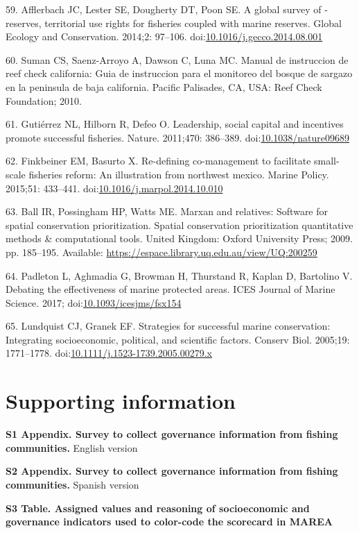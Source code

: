 \documentclass[12pt,]{article}
\begin{document}
\hypertarget{ref-afflerbach_2014-HP}{}
59. Afflerbach JC, Lester SE, Dougherty DT, Poon SE. A global survey of
-reserves, territorial use rights for fisheries coupled with marine
reserves. Global Ecology and Conservation. 2014;2: 97--106.
doi:\href{https://doi.org/10.1016/j.gecco.2014.08.001}{10.1016/j.gecco.2014.08.001}

\hypertarget{ref-suman_2010-ez}{}
60. Suman CS, Saenz-Arroyo A, Dawson C, Luna MC. Manual de instruccion
de reef check california: Guia de instruccion para el monitoreo del
bosque de sargazo en la peninsula de baja california. Pacific Palisades,
CA, USA: Reef Check Foundation; 2010.

\hypertarget{ref-gutirrez_2011-0U}{}
61. Gutiérrez NL, Hilborn R, Defeo O. Leadership, social capital and
incentives promote successful fisheries. Nature. 2011;470: 386--389.
doi:\href{https://doi.org/10.1038/nature09689}{10.1038/nature09689}

\hypertarget{ref-finkbeiner_2015-87}{}
62. Finkbeiner EM, Basurto X. Re-defining co-management to facilitate
small-scale fisheries reform: An illustration from northwest mexico.
Marine Policy. 2015;51: 433--441.
doi:\href{https://doi.org/10.1016/j.marpol.2014.10.010}{10.1016/j.marpol.2014.10.010}

\hypertarget{ref-ball_2009-qi}{}
63. Ball IR, Possingham HP, Watts ME. Marxan and relatives: Software for
spatial conservation prioritization. Spatial conservation prioritization
quantitative methods \& computational tools. United Kingdom: Oxford
University Press; 2009. pp. 185--195. Available:
\url{https://espace.library.uq.edu.au/view/UQ:200259}

\hypertarget{ref-padleton_2017-vn}{}
64. Padleton L, Aghmadia G, Browman H, Thurstand R, Kaplan D, Bartolino
V. Debating the effectiveness of marine protected areas. ICES Journal of
Marine Science. 2017;
doi:\href{https://doi.org/10.1093/icesjms/fsx154}{10.1093/icesjms/fsx154}

\hypertarget{ref-lundquist_2005-OL}{}
65. Lundquist CJ, Granek EF. Strategies for successful marine
conservation: Integrating socioeconomic, political, and scientific
factors. Conserv Biol. 2005;19: 1771--1778.
doi:\href{https://doi.org/10.1111/j.1523-1739.2005.00279.x}{10.1111/j.1523-1739.2005.00279.x}

\section{Supporting information}\label{supporting-information}

\textbf{S1 Appendix. Survey to collect governance information from
fishing communities.} English version

\textbf{S2 Appendix. Survey to collect governance information from
fishing communities.} Spanish version

\textbf{S3 Table. Assigned values and reasoning of socioeconomic and
governance indicators used to color-code the scorecard in MAREA}
\end{document}
